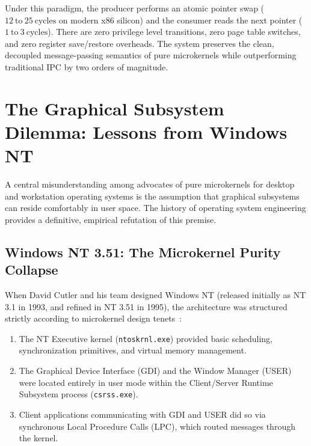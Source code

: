 \documentclass[10pt,journal,compsoc,twocolumn]{article}
\begin{document}
Under this paradigm, the producer performs an atomic pointer swap ($12\ \text{to}\ 25\ \text{cycles}$ on modern x86 silicon) and the consumer reads the next pointer ($1\ \text{to}\ 3\ \text{cycles}$). There are zero privilege level transitions, zero page table switches, and zero register save/restore overheads. The system preserves the clean, decoupled message-passing semantics of pure microkernels while outperforming traditional IPC by two orders of magnitude.

\section{The Graphical Subsystem Dilemma: Lessons from Windows NT}
\label{sec:graphics_dilemma}

A central misunderstanding among advocates of pure microkernels for desktop and workstation operating systems is the assumption that graphical subsystems can reside comfortably in user space. The history of operating system engineering provides a definitive, empirical refutation of this premise.

\subsection{Windows NT 3.51: The Microkernel Purity Collapse}
When David Cutler and his team designed Windows NT (released initially as NT 3.1 in 1993, and refined in NT 3.51 in 1995), the architecture was structured strictly according to microkernel design tenets~\cite{solomon1998inside,cutler1993nt}:
\begin{enumerate}[leftmargin=*]
    \item The NT Executive kernel (\texttt{ntoskrnl.exe}) provided basic scheduling, synchronization primitives, and virtual memory management.
    \item The Graphical Device Interface (GDI) and the Window Manager (USER) were located entirely in user mode within the Client/Server Runtime Subsystem process (\texttt{csrss.exe}).
    \item Client applications communicating with GDI and USER did so via synchronous Local Procedure Calls (LPC), which routed messages through the kernel.
\end{enumerate}
\end{document}
